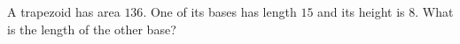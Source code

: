 A trapezoid has area $136$. One of its bases has length $15$ and its height is $8$. What is the length of the other base?
